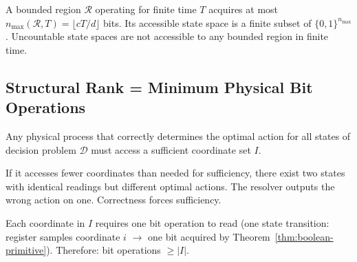 \begin{corollary}\label{cor:finite-state}
A bounded region $\mathcal{R}$ operating for finite time $T$ acquires at most
$n_{\max}(\mathcal{R}, T) = \lfloor cT/d \rfloor$ bits. Its accessible state
space is a finite subset of $\{0,1\}^{n_{\max}}$.
Uncountable state spaces are not accessible to any bounded region
in finite time.
\end{corollary}

\subsection{Structural Rank = Minimum Physical Bit Operations}\label{sec:srank-physical}

\begin{theorem}\label{thm:resolution-sufficient}
Any physical process that correctly determines the optimal action for all states
of decision problem $\mathcal{D}$ must access a sufficient coordinate set $I$.

If it accesses fewer coordinates than needed for sufficiency, there exist two
states with identical readings but different optimal actions. The resolver
outputs the wrong action on one. Correctness forces sufficiency.

Each coordinate in $I$ requires one bit operation to read (one state transition:
register samples coordinate $i$ $\to$ one bit acquired by Theorem~\ref{thm:boolean-primitive}).
Therefore: bit operations $\geq |I|$.
\end{theorem}

